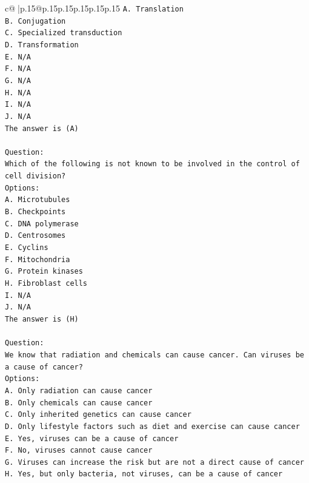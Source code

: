\documentclass{article}
\begin{document}
{\begin{supertabular}{c@{$\;$}|p{.15\linewidth}@{}p{.15\linewidth}p{.15\linewidth}p{.15\linewidth}p{.15\linewidth}p{.15\linewidth}}
{{{\texttt{A. Translation} \\
\texttt{B. Conjugation} \\
\texttt{C. Specialized transduction} \\
\texttt{D. Transformation} \\
\texttt{E. N/A} \\
\texttt{F. N/A} \\
\texttt{G. N/A} \\
\texttt{H. N/A} \\
\texttt{I. N/A} \\
\texttt{J. N/A} \\
\texttt{The answer is (A)} \\
\\ 
\texttt{Question:} \\
\texttt{Which of the following is not known to be involved in the control of cell division?} \\
\texttt{Options:} \\
\texttt{A. Microtubules} \\
\texttt{B. Checkpoints} \\
\texttt{C. DNA polymerase} \\
\texttt{D. Centrosomes} \\
\texttt{E. Cyclins} \\
\texttt{F. Mitochondria} \\
\texttt{G. Protein kinases} \\
\texttt{H. Fibroblast cells} \\
\texttt{I. N/A} \\
\texttt{J. N/A} \\
\texttt{The answer is (H)} \\
\\ 
\texttt{Question:} \\
\texttt{We know that radiation and chemicals can cause cancer. Can viruses be a cause of cancer?} \\
\texttt{Options:} \\
\texttt{A. Only radiation can cause cancer} \\
\texttt{B. Only chemicals can cause cancer} \\
\texttt{C. Only inherited genetics can cause cancer} \\
\texttt{D. Only lifestyle factors such as diet and exercise can cause cancer} \\
\texttt{E. Yes, viruses can be a cause of cancer} \\
\texttt{F. No, viruses cannot cause cancer} \\
\texttt{G. Viruses can increase the risk but are not a direct cause of cancer} \\
\texttt{H. Yes, but only bacteria, not viruses, can be a cause of cancer} \\
            }
        }
    }
     \\ \\


\end{supertabular}}
\end{document}
